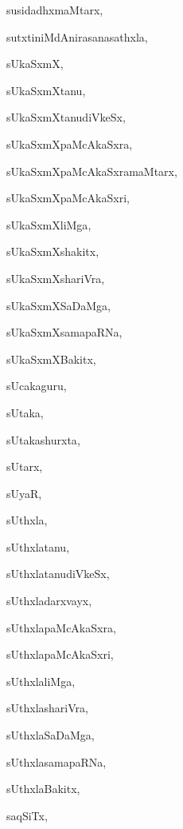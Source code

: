 \begin{multicols}{2}
{susidadhxmaMtarx}, \pageref{susidadhxmaMtarx}

{sutxtiniMdAnirasanasathxla}, \pageref{sutxtiniMdAnirasanasathxla}

{sUkaSxmX}, \pageref{sUkaSxmX}

{sUkaSxmXtanu}, \pageref{sUkaSxmXtanu}

{sUkaSxmXtanudiVkeSx}, \pageref{sUkaSxmXtanudiVkeSx}

{sUkaSxmXpaMcAkaSxra}, \pageref{sUkaSxmXpaMcAkaSxra}

{sUkaSxmXpaMcAkaSxramaMtarx}, \pageref{sUkaSxmXpaMcAkaSxramaMtarx}

{sUkaSxmXpaMcAkaSxri}, \pageref{sUkaSxmXpaMcAkaSxri}

{sUkaSxmXliMga}, \pageref{sUkaSxmXliMga}

{sUkaSxmXshakitx}, \pageref{sUkaSxmXshakitx}

{sUkaSxmXshariVra}, \pageref{sUkaSxmXshariVra}

{sUkaSxmXSaDaMga}, \pageref{sUkaSxmXSaDaMga}

{sUkaSxmXsamapaRNa}, \pageref{sUkaSxmXsamapaRNa}

{sUkaSxmXBakitx}, \pageref{sUkaSxmXBakitx}

{sUcakaguru}, \pageref{sUcakaguru}

{sUtaka}, \pageref{sUtaka}

{sUtakashurxta}, \pageref{sUtakashurxta}

{sUtarx}, \pageref{sUtarx}

{sUyaR}, \pageref{sUyaR}

{sUthxla}, \pageref{sUthxla}

{sUthxlatanu}, \pageref{sUthxlatanu}

{sUthxlatanudiVkeSx}, \pageref{sUthxlatanudiVkeSx}

{sUthxladarxvayx}, \pageref{sUthxladarxvayx}

{sUthxlapaMcAkaSxra}, \pageref{sUthxlapaMcAkaSxra}

{sUthxlapaMcAkaSxri}, \pageref{sUthxlapaMcAkaSxri}

{sUthxlaliMga}, \pageref{sUthxlaliMga}

{sUthxlashariVra}, \pageref{sUthxlashariVra}

{sUthxlaSaDaMga}, \pageref{sUthxlaSaDaMga}

{sUthxlasamapaRNa}, \pageref{sUthxlasamapaRNa}

{sUthxlaBakitx}, \pageref{sUthxlaBakitx}

{saqSiTx}, \pageref{saqSiTx}


\end{multicols}
